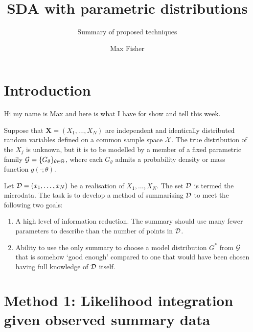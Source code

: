 \documentclass[11pt,paper=a4,numbers=noendperiod]{scrartcl} %
\title{SDA with parametric distributions}
\subtitle{Summary of proposed techniques}
\author{Max Fisher}
\begin{document}
\maketitle

\section{Introduction}
Hi my name is Max and here is what I have for show and tell this week.

Suppose that $\mathbf{X} = (X_1, \ldots, X_N)$ are independent and identically distributed
random variables defined on a common sample space $\mathcal{X}$. The true
distribution of the $X_j$ is unknown, but it is to be modelled by a member of a
fixed parametric family $\mathcal{G} = \{G_\theta\}_{\theta \in \Theta}$, where
each $G_\theta$ admits a probability density or mass function $g(\cdot; \theta)$.

Let $\mathcal{D} = (x_1, \ldots, x_N)$ be a realisation of $X_1, \ldots, X_N$.
The set $\mathcal{D}$ is termed the microdata. The task is to develop a method of
summarising $\mathcal{D}$ to meet the following two goals:
\begin{enumerate}
    \item A high level of information reduction. The summary should use many
        fewer parameters to describe than the number of points in $\mathcal{D}$.
    \item Ability to use the only summary to choose a model distribution $G^{*}$
        from $\mathcal{G}$ that is somehow `good enough' compared to one that
        would have been chosen having full knowledge of $\mathcal{D}$ itself.
\end{enumerate}

\section{Method 1: Likelihood integration given observed summary data}
\end{document}
